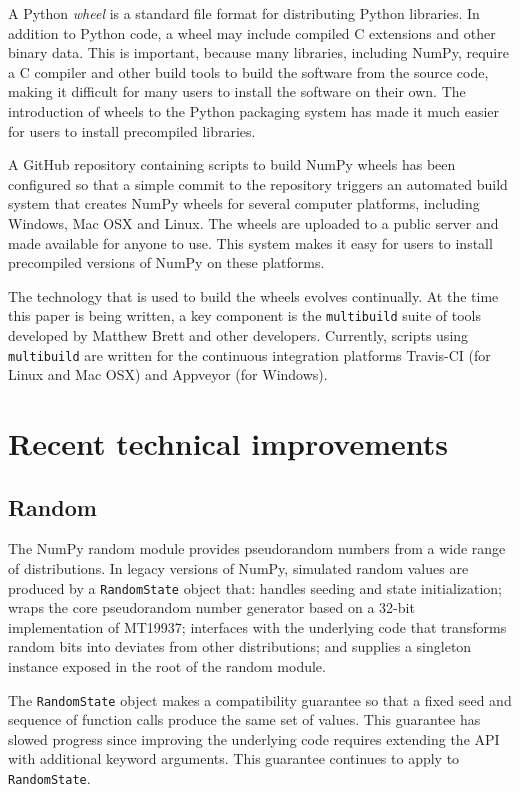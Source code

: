 \documentclass[fleqn,10pt]{wlscirep}
\newcommand{\code}[1]{\texttt{#1}}
\begin{document}
A Python \emph{wheel}\cite{PEP427} is a standard file format for
distributing Python libraries.  In addition to Python code, a
wheel may include compiled C extensions and other binary data.
This is important, because many libraries, including NumPy,
require a C compiler and other build tools to build the software
from the source code, making it difficult for many users to install
the software on their own.  The introduction of wheels to the Python
packaging system has made it much easier for users to install
precompiled libraries.

A GitHub repository containing scripts to build NumPy wheels has
been configured so that a simple commit to the repository triggers
an automated build system that creates NumPy wheels for several
computer platforms, including Windows, Mac OSX and Linux.  The wheels
are uploaded to a public server and made available for anyone to use.
This system makes it easy for users to install precompiled versions
of NumPy on these platforms.

The technology that is used to build the wheels evolves continually.
At the time this paper is being written, a key component is the
\code{multibuild} suite of tools developed by Matthew Brett and
other developers\cite{multibuild}.  Currently, scripts using
\code{multibuild} are written for the continuous integration
platforms Travis-CI (for Linux and Mac OSX) and Appveyor
(for Windows).


\section*{Recent technical improvements}

\subsection*{Random}

The NumPy random module provides pseudorandom numbers from a wide range of
distributions. In legacy versions of NumPy, simulated random values are produced
by a \code{RandomState} object that: handles seeding and state initialization;
wraps the core pseudorandom number generator based on a 32-bit implementation of
MT19937; interfaces with the underlying code that transforms random bits into
deviates from other distributions; and supplies a singleton instance exposed in
the root of the random module.

The \code{RandomState} object makes a compatibility guarantee so that a fixed
seed and sequence of function calls produce the same set of values. This
guarantee has slowed progress since improving the underlying code requires
extending the API with additional keyword arguments. This guarantee continues to
apply to \code{RandomState}. 
\end{document}
